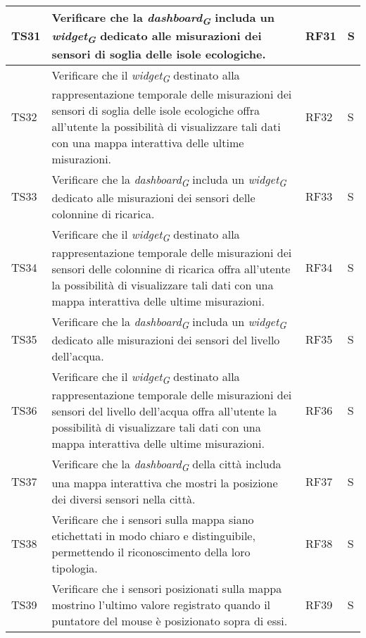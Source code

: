 \begin{longtable}{|C{1.9cm}|L{5cm}|C{2cm}|C{2cm}|}
    TS31 & Verificare che la \textit{dashboard}\textsubscript{\textit{G}} includa un \textit{widget}\textsubscript{\textit{G}} dedicato alle misurazioni dei sensori di soglia delle isole ecologiche. & RF31 & S \\
    \hline

    TS32 & Verificare che il \textit{widget}\textsubscript{\textit{G}} destinato alla rappresentazione temporale delle misurazioni dei sensori di soglia delle isole ecologiche offra all'utente la possibilità di visualizzare tali dati con una mappa interattiva delle ultime misurazioni. & RF32 & S \\
    \hline

    TS33 & Verificare che la \textit{dashboard}\textsubscript{\textit{G}} includa un \textit{widget}\textsubscript{\textit{G}} dedicato alle misurazioni dei sensori delle colonnine di ricarica. & RF33 & S \\
    \hline

    TS34 & Verificare che il \textit{widget}\textsubscript{\textit{G}} destinato alla rappresentazione temporale delle misurazioni dei sensori delle colonnine di ricarica offra all'utente la possibilità di visualizzare tali dati con una mappa interattiva delle ultime misurazioni. & RF34 & S \\
    \hline

    TS35 & Verificare che la \textit{dashboard}\textsubscript{\textit{G}} includa un \textit{widget}\textsubscript{\textit{G}} dedicato alle misurazioni dei sensori del livello dell'acqua. & RF35 & S \\
    \hline

    TS36 & Verificare che il \textit{widget}\textsubscript{\textit{G}} destinato alla rappresentazione temporale delle misurazioni dei sensori del livello dell'acqua offra all'utente la possibilità di visualizzare tali dati con una mappa interattiva delle ultime misurazioni. & RF36 & S \\
    \hline

    TS37 & Verificare che la \textit{dashboard}\textsubscript{\textit{G}} della città includa una mappa interattiva che mostri la posizione dei diversi sensori nella città. & RF37 & S \\
    \hline

    TS38 & Verificare che i sensori sulla mappa siano etichettati in modo chiaro e distinguibile, permettendo il riconoscimento della loro tipologia. & RF38 & S \\
    \hline

    TS39 & Verificare che i sensori posizionati sulla mappa mostrino l'ultimo valore registrato quando il puntatore del mouse è posizionato sopra di essi. & RF39 & S \\
    \hline


\end{longtable}
